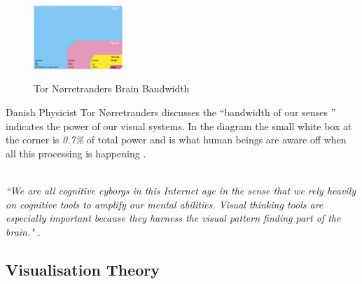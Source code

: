 \documentclass[a4paper,11pt,titlepage]{article}
\begin{document}
		\begin{figure}[H]
    			\centering	
			{{\includegraphics[width=0.3\textwidth]
    				{img/brain_bandwidth.png} 
    			}}%
    			\caption{Tor Nørretranders Brain Bandwidth}%
    		\label{fig:TufteExcellence}
		\end{figure}
		
		\par 
		Danish Physicist Tor Nørretranders discusses the ``bandwidth of our senses ” indicates the power of our visual systems. In the diagram the small white box at the corner is \textit{0.7\%} of total power and is what human beings are aware off when all this processing is happening \cite{Tufte2012}.		
		\\\
		\par 
		\textit{``We are all cognitive cyborgs in this Internet age in the sense that we rely heavily on cognitive tools to amplify our mental abilities. Visual thinking tools are especially important because they harness the visual pattern finding part of the brain."} \cite{Ware2010}.


	\subsection{Visualisation Theory}
\end{document}

